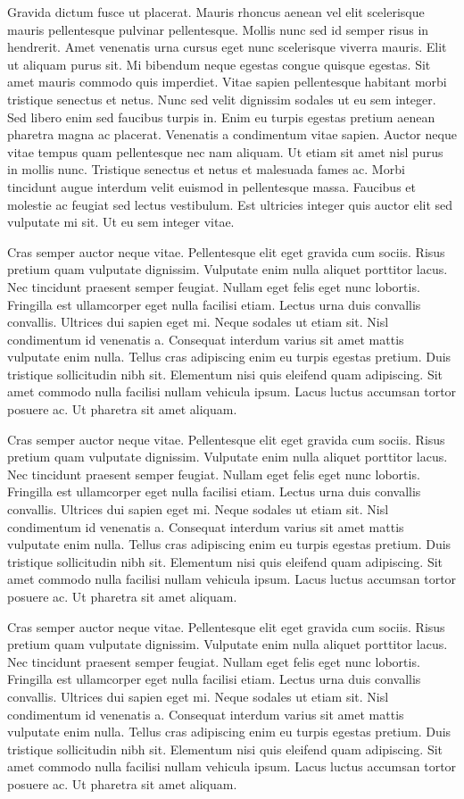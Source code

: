 \documentclass[11pt,a4paper]{article}
\begin{document}
Gravida dictum fusce ut placerat. Mauris rhoncus aenean vel elit scelerisque mauris pellentesque pulvinar pellentesque. Mollis nunc sed id semper risus in hendrerit. Amet venenatis urna cursus eget nunc scelerisque viverra mauris. Elit ut aliquam purus sit. Mi bibendum neque egestas congue quisque egestas. Sit amet mauris commodo quis imperdiet. Vitae sapien pellentesque habitant morbi tristique senectus et netus. Nunc sed velit dignissim sodales ut eu sem integer. Sed libero enim sed faucibus turpis in. Enim eu turpis egestas pretium aenean pharetra magna ac placerat. Venenatis a condimentum vitae sapien. Auctor neque vitae tempus quam pellentesque nec nam aliquam. Ut etiam sit amet nisl purus in mollis nunc. Tristique senectus et netus et malesuada fames ac. Morbi tincidunt augue interdum velit euismod in pellentesque massa. Faucibus et molestie ac feugiat sed lectus vestibulum. Est ultricies integer quis auctor elit sed vulputate mi sit. Ut eu sem integer vitae.

Cras semper auctor neque vitae. Pellentesque elit eget gravida cum sociis. Risus pretium quam vulputate dignissim. Vulputate enim nulla aliquet porttitor lacus. Nec tincidunt praesent semper feugiat. Nullam eget felis eget nunc lobortis. Fringilla est ullamcorper eget nulla facilisi etiam. Lectus urna duis convallis convallis. Ultrices dui sapien eget mi. Neque sodales ut etiam sit. Nisl condimentum id venenatis a. Consequat interdum varius sit amet mattis vulputate enim nulla. Tellus cras adipiscing enim eu turpis egestas pretium. Duis tristique sollicitudin nibh sit. Elementum nisi quis eleifend quam adipiscing. Sit amet commodo nulla facilisi nullam vehicula ipsum. Lacus luctus accumsan tortor posuere ac. Ut pharetra sit amet aliquam.

Cras semper auctor neque vitae. Pellentesque elit eget gravida cum sociis. Risus pretium quam vulputate dignissim. Vulputate enim nulla aliquet porttitor lacus. Nec tincidunt praesent semper feugiat. Nullam eget felis eget nunc lobortis. Fringilla est ullamcorper eget nulla facilisi etiam. Lectus urna duis convallis convallis. Ultrices dui sapien eget mi. Neque sodales ut etiam sit. Nisl condimentum id venenatis a. Consequat interdum varius sit amet mattis vulputate enim nulla. Tellus cras adipiscing enim eu turpis egestas pretium. Duis tristique sollicitudin nibh sit. Elementum nisi quis eleifend quam adipiscing. Sit amet commodo nulla facilisi nullam vehicula ipsum. Lacus luctus accumsan tortor posuere ac. Ut pharetra sit amet aliquam.

Cras semper auctor neque vitae. Pellentesque elit eget gravida cum sociis. Risus pretium quam vulputate dignissim. Vulputate enim nulla aliquet porttitor lacus. Nec tincidunt praesent semper feugiat. Nullam eget felis eget nunc lobortis. Fringilla est ullamcorper eget nulla facilisi etiam. Lectus urna duis convallis convallis. Ultrices dui sapien eget mi. Neque sodales ut etiam sit. Nisl condimentum id venenatis a. Consequat interdum varius sit amet mattis vulputate enim nulla. Tellus cras adipiscing enim eu turpis egestas pretium. Duis tristique sollicitudin nibh sit. Elementum nisi quis eleifend quam adipiscing. Sit amet commodo nulla facilisi nullam vehicula ipsum. Lacus luctus accumsan tortor posuere ac. Ut pharetra sit amet aliquam.
\end{document}

